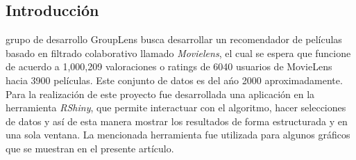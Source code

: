 \documentclass{sciposter}
\begin{document}
\begin{multicols}{3}

\begin{abstract}
En este art\'iculo se dan a conocer los conceptos b\'asicos requeridos para empezar a comprender los sistemas de recomendaci\'on, espec\'ificamente bajo el uso de filtrado colaborativo.\\
La plataforma Kaggle permite utilizar datasets para la resoluci\'on de determinados problemas de miner\'ia de datos. El problema en cuesti\'on es la realizaci\'on de un sistema que sirva de recomendador de pel\'iculas de acuerdo a ciertas votaciones realizadas por un grupo de usuarios a un grupo de pel\'iculas de diferentes g\'eneros, duraciones y clasificaciones.\\
Al trabajar con una cantidad tan grande de elementos hubo problemas al momento de realizar an\'alisis  porque el proceso se hacia un tanto tedioso y la lenta respuesta de los computadores hizo que las pruebas fueran la parte del proyecto que m\'as tiempo demandara..\\
Los resultados de las predicciones fueron acertados hasta cierto punto, debido a que la cantidad de votaciones, a pesar de ser en gran n\'umero, no fue suficiente para realizar una predicci\'on m\'as acertada y precisa. Sin embargo se lograron predecir todos los valores para los usuarios en cuesti\'on, m\'as adelante se hablar\'a al respecto con mayor detenimiento

\end{abstract}

\section{Introducci\'on}
 grupo de desarrollo GroupLens busca desarrollar un recomendador de pel\'iculas basado en filtrado colaborativo llamado \emph{Movielens}, el cual se espera que funcione de acuerdo a  1,000,209 valoraciones o ratings de 6040 usuarios de MovieLens hacia 3900 pel\'iculas. Este conjunto de datos es del a\'no 2000 aproximadamente.
\\
Para la realizaci\'on de este proyecto fue desarrollada una aplicaci\'on en la herramienta \emph{RShiny}, que permite interactuar con el algoritmo, hacer selecciones de datos y as\'i de esta manera mostrar los resultados de forma estructurada y en una sola ventana. La mencionada herramienta fue utilizada para algunos gr\'aficos que se muestran en el presente art\'iculo.

\end{multicols}
\end{document}
